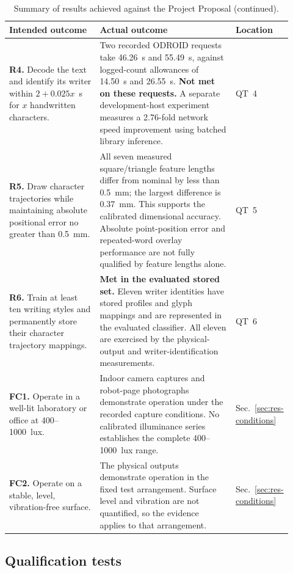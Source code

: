 \begin{table}[!htbp]\ContinuedFloat\centering\small
\setlength{\tabcolsep}{5pt}
\begin{tabular}{p{0.32\linewidth}p{0.48\linewidth}p{0.12\linewidth}}\toprule
\textbf{Intended outcome} & \textbf{Actual outcome} & \textbf{Location}\\\midrule
\textbf{R4.} Decode the text and identify its writer within $2+0.025x$~s for $x$ handwritten characters. & Two recorded ODROID requests take 46.26~s and 55.49~s, against logged-count allowances of 14.50~s and 26.55~s. \textbf{Not met on these requests.} A separate development-host experiment measures a 2.76-fold network speed improvement using batched library inference. & QT~4\\[5pt]
\textbf{R5.} Draw character trajectories while maintaining absolute positional error no greater than 0.5~mm. & All seven measured square/triangle feature lengths differ from nominal by less than 0.5~mm; the largest difference is 0.37~mm. This supports the calibrated dimensional accuracy. Absolute point-position error and repeated-word overlay performance are not fully qualified by feature lengths alone. & QT~5\\[5pt]
\textbf{R6.} Train at least ten writing styles and permanently store their character trajectory mappings. & \textbf{Met in the evaluated stored set.} Eleven writer identities have stored profiles and glyph mappings and are represented in the evaluated classifier. All eleven are exercised by the physical-output and writer-identification measurements. & QT~6\\[5pt]
\textbf{FC1.} Operate in a well-lit laboratory or office at 400--1000~lux. & Indoor camera captures and robot-page photographs demonstrate operation under the recorded capture conditions. No calibrated illuminance series establishes the complete 400--1000~lux range. & Sec.~\ref{sec:res-conditions}\\[5pt]
\textbf{FC2.} Operate on a stable, level, vibration-free surface. & The physical outputs demonstrate operation in the fixed test arrangement. Surface level and vibration are not quantified, so the evidence applies to that arrangement. & Sec.~\ref{sec:res-conditions}\\
\bottomrule\end{tabular}
\caption{Summary of results achieved against the Project Proposal (continued).}
\end{table}
\FloatBarrier

\subsection{Qualification tests}
\label{sec:res-qtp}
